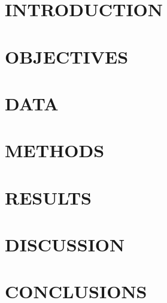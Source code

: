 \documentclass[abstract=true, %
              titlepage=true, %
              fontsize=12pt, 
              pagesize=auto, %
              DIV=13, BCOR=5mm, %
              headings=normal, %
              bibliography=totocnumbered, %
              numbers=noenddot, %
              parskip=half]{scrartcl} %
\begin{document}
\clearpage
\newpage

\setcounter{table}{1} %
\setcounter{figure}{0}
\renewcommand{\angle}{0}

\section{INTRODUCTION}
\label{sec:introduction}



\section{OBJECTIVES}
\label{sec:objectives}



\clearpage

\section{DATA}
\label{sec:data}



\clearpage

\section{METHODS}
\label{sec:methods}



\clearpage

\section{RESULTS}
\label{sec:results}



\clearpage

\section{DISCUSSION}
\label{sec:discussion}



\clearpage

\section{CONCLUSIONS}
\label{sec:conclusion}
\end{document}
